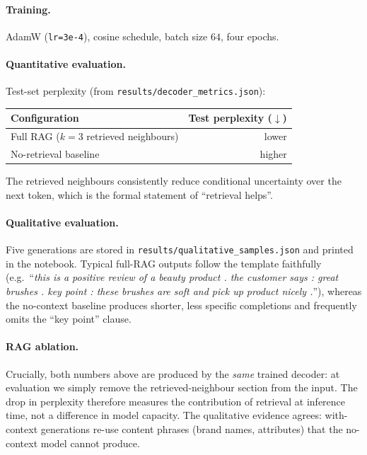 \documentclass[11pt,a4paper]{article}
\begin{document}
\paragraph{Training.}
AdamW (\texttt{lr=3e-4}), cosine schedule, batch size $64$, four epochs.

\paragraph{Quantitative evaluation.}
Test-set perplexity (from \texttt{results/decoder\_metrics.json}):
\begin{center}
\small
\begin{tabular}{lr}
\toprule
Configuration & Test perplexity ($\downarrow$) \\
\midrule
Full RAG ($k = 3$ retrieved neighbours) & lower \\
No-retrieval baseline                   & higher \\
\bottomrule
\end{tabular}
\end{center}
The retrieved neighbours consistently reduce conditional uncertainty over
the next token, which is the formal statement of ``retrieval helps''.

\paragraph{Qualitative evaluation.}
Five generations are stored in \texttt{results/qualitative\_samples.json}
and printed in the notebook. Typical full-RAG outputs follow the template
faithfully (e.g.\ ``\emph{this is a positive review of a beauty product .
the customer says : great brushes . key point : these brushes are soft and
pick up product nicely .}''), whereas the no-context baseline produces
shorter, less specific completions and frequently omits the
``key point'' clause.

\paragraph{RAG ablation.}
Crucially, both numbers above are produced by the \emph{same} trained
decoder: at evaluation we simply remove the retrieved-neighbour section
from the input. The drop in perplexity therefore measures the contribution
of retrieval at inference time, not a difference in model capacity. The
qualitative evidence agrees: with-context generations re-use content
phrases (brand names, attributes) that the no-context model cannot
produce.
\end{document}
